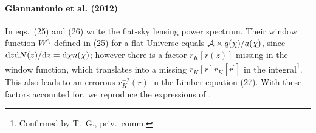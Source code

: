 \documentclass[fleqn,usenatbib]{mnras} %
\newcommand{\pref}{{\cal A}}
\begin{document}
\begin{appendix}
\paragraph{Giannantonio et al. (2012)}

In eqs.~(25) and (26) \cite{2012MNRAS.422.2854G} write the flat-sky lensing
power spectrum. Their window function $W^{\varepsilon_i}$ defined in (25) for a
flat Universe equals $\pref \times q(\chi) / a(\chi)$, since ${\rm d} z {\rm d}
N(z)/{\rm d} z = {\rm d} \chi n(\chi)$; however there is a factor $r_K[r(z)]$
missing in the window function, which translates into a missing $r_K[r]
r_K[r^\prime]$ in the integral\footnote{Confirmed by T.~G., priv.~comm.}. This
also leads to an errorous $r_K^{-2}(r)$ in the Limber equation (27). With these
factors accounted for, we reproduce the expressions of \cite{2012MNRAS.422.2854G}.


\label{lastpage}

\end{appendix}
\end{document}
